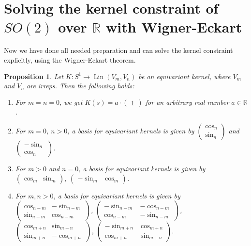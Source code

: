 \documentclass[12pt, a4paper]{article}
\theoremstyle{plain}
\newtheorem{pro}{Proposition}[section]
\theoremstyle{definition}
\theoremstyle{remark}
\newcommand{\R}{\mathds{R}}
\DeclareMathOperator{\lin}{Lin}
\begin{document}
\section{Solving the kernel constraint of $SO(2)$ over $\R$ with Wigner-Eckart}

Now we have done all needed preparation and can solve the kernel constraint explicitly, using the Wigner-Eckart theorem.

\begin{pro}
Let $K: S^1 \to \lin(V_m, V_n)$ be an equivariant kernel, where $V_m$ and $V_n$ are irreps. Then the following holds:

\begin{enumerate}
\item For $m = n = 0$, we get $K(s) = a \cdot \begin{pmatrix} 1 \end{pmatrix}$ for an arbitrary real number $a \in \R$.
\item For $m = 0$, $n > 0$, a basis for equivariant kernels is given by $\begin{pmatrix} \cos_n \\ \sin_n \end{pmatrix}$ and $\begin{pmatrix}- \sin_n \\ \cos_n \end{pmatrix}$.
\item For $m > 0$ and $n = 0$, a basis for equivariant kernels is given by $\begin{pmatrix} \cos_m & \sin_m \end{pmatrix}$, $\begin{pmatrix}  - \sin_m & \cos_m \end{pmatrix}$.
\item For $m, n > 0$, a basis for equivariant kernels is given by $\begin{pmatrix} \cos_{n-m} & - \sin_{n-m} \\ \sin_{n-m} & \cos_{n-m} \end{pmatrix}$, $\begin{pmatrix} - \sin_{n-m} & -\cos_{n-m} \\ \cos_{n-m} & -\sin_{n-m} \end{pmatrix}$, $\begin{pmatrix} \cos_{m+n} & \sin_{m+n} \\ \sin_{m+n} & - \cos_{m+n}\end{pmatrix}$, $\begin{pmatrix} -\sin_{m+n} & \cos_{m+n} \\ \cos_{m+n} & \sin_{m+n} \end{pmatrix}$.
\end{enumerate}
\end{pro}
\end{document}
